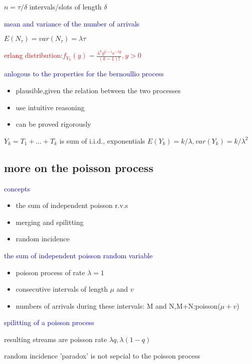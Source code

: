 $n=\tau/\delta$ intervals/slots of length $\delta$

\textcolor{blue}{mean and variance of the number of arrivals}

$E(N_\tau)=var(N_\tau)=\lambda \tau$


\textcolor{red}{erlang distribution:$f_{Y_k}(y)=\frac{\lambda^ky^{k-1}e^{-\lambda y}}{(k-1)!},y>0$}


\textcolor{blue}{anlogous to the properties for the bernoullio process}
\begin{itemize}
    \item plausible,given the relation between the two processes
    \item use intuitive reasoning
    \item can be proved rigorously
\end{itemize}


$Y_k=T_1+...+T_k$ is sum of i.i.d., exponentials $E(Y_k)=k/\lambda,var(Y_k)=k/\lambda ^2$


\subsection{more on the poisson process}

\textcolor{blue}{concepts}
\begin{itemize}
    \item the sum of independent poisson r.v.s
    \item merging and spilitting
    \item random incidence
\end{itemize}

\textcolor{blue}{the sum of independent poisson random variable}

\begin{itemize}
    \item poisson process of rate $\lambda=1$
    \item consecutive intervals of length $\mu$ and $v$
    \item numbers of arrivals during these intervals: M and N,M+N:poisson($\mu+v$) 
\end{itemize}

\textcolor{blue}{spilitting of a poisson process}

resulting streams are poisson rate $\lambda q, \lambda(1-q)$

random incidence 'paradox' is not sepcial to the poisson process